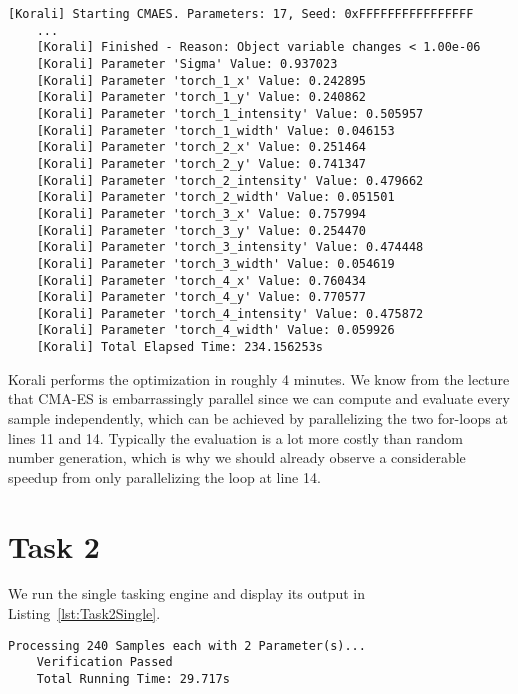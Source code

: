 \documentclass[11pt]{article}
\begin{document}
    \begin{lstlisting}[basicstyle=\tiny, frame=single, caption={Korali
    output when maximizing the posterior distribution of the parameters for
    the model with four robotic torches.}, label={lst:Task1}]
    [Korali] Starting CMAES. Parameters: 17, Seed: 0xFFFFFFFFFFFFFFFF
    ...
    [Korali] Finished - Reason: Object variable changes < 1.00e-06
    [Korali] Parameter 'Sigma' Value: 0.937023
    [Korali] Parameter 'torch_1_x' Value: 0.242895
    [Korali] Parameter 'torch_1_y' Value: 0.240862
    [Korali] Parameter 'torch_1_intensity' Value: 0.505957
    [Korali] Parameter 'torch_1_width' Value: 0.046153
    [Korali] Parameter 'torch_2_x' Value: 0.251464
    [Korali] Parameter 'torch_2_y' Value: 0.741347
    [Korali] Parameter 'torch_2_intensity' Value: 0.479662
    [Korali] Parameter 'torch_2_width' Value: 0.051501
    [Korali] Parameter 'torch_3_x' Value: 0.757994
    [Korali] Parameter 'torch_3_y' Value: 0.254470
    [Korali] Parameter 'torch_3_intensity' Value: 0.474448
    [Korali] Parameter 'torch_3_width' Value: 0.054619
    [Korali] Parameter 'torch_4_x' Value: 0.760434
    [Korali] Parameter 'torch_4_y' Value: 0.770577
    [Korali] Parameter 'torch_4_intensity' Value: 0.475872
    [Korali] Parameter 'torch_4_width' Value: 0.059926
    [Korali] Total Elapsed Time: 234.156253s
    \end{lstlisting}

    Korali performs the optimization in roughly 4 minutes.
    We know from the lecture that CMA-ES is embarrassingly parallel since we
    can compute and evaluate every sample independently, which can be
    achieved by parallelizing the two for-loops at lines 11 and 14.
    Typically the evaluation is a lot more costly than random
    number generation, which is why we should already observe a considerable
    speedup from only parallelizing the loop at line 14.

    \section*{Task 2}
    \label{sec:Task2}

    We run the single tasking engine and display its output in
    Listing~\ref{lst:Task2Single}.

    \begin{lstlisting}[basicstyle=\tiny, frame=single, caption={Output from
    executing the single tasking engine.}, label={lst:Task2Single}]
    Processing 240 Samples each with 2 Parameter(s)...
    Verification Passed
    Total Running Time: 29.717s
    \end{lstlisting}
\end{document}
